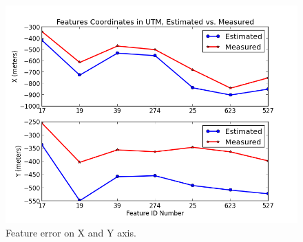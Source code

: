 \begin{figure}[h]
\centering
\includegraphics[width=13cm, keepaspectratio=true]
{./Figures/fltfig/airport/Feature_plot_(x,y).png}
\caption{Feature error on X and Y axis. }
\label{fltfig:15}
\end{figure}

